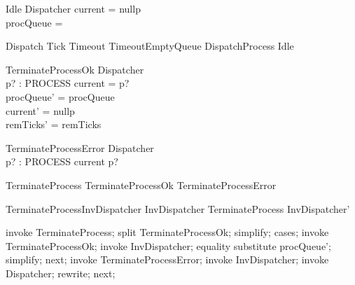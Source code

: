 \begin{schema}{Idle}
    \Xi Dispatcher
\where
    current = nullp \\
    procQueue = \emptyset
\end{schema}

\begin{zed}
    Dispatch  Tick \lor Timeout \lor TimeoutEmptyQueue \lor DispatchProcess \lor Idle
\end{zed}

\begin{schema}{TerminateProcessOk}
    \Delta Dispatcher \\
    p? : PROCESS
\where
    current = p? \\
    procQueue' = procQueue \\
    current' = nullp \\
    remTicks' = remTicks
\end{schema}

\begin{schema}{TerminateProcessError}
    \Xi Dispatcher \\
    p? : PROCESS
\where
    current \neq p?
\end{schema}

\begin{zed}
    TerminateProcess  TerminateProcessOk \lor TerminateProcessError
\end{zed}


\begin{theorem}{TerminateProcessInvDispatcher}
    InvDispatcher \land TerminateProcess \implies InvDispatcher'
\end{theorem}

\begin{zproof}[TerminateProcessInvDispatcher]
    invoke TerminateProcess;
    split TerminateProcessOk;
    simplify;
    cases;
    invoke TerminateProcessOk;
    invoke InvDispatcher;
    equality substitute procQueue';
    simplify;
    next;
    invoke TerminateProcessError;
    invoke InvDispatcher;
    invoke \Xi Dispatcher;
    rewrite;
    next;
\end{zproof}